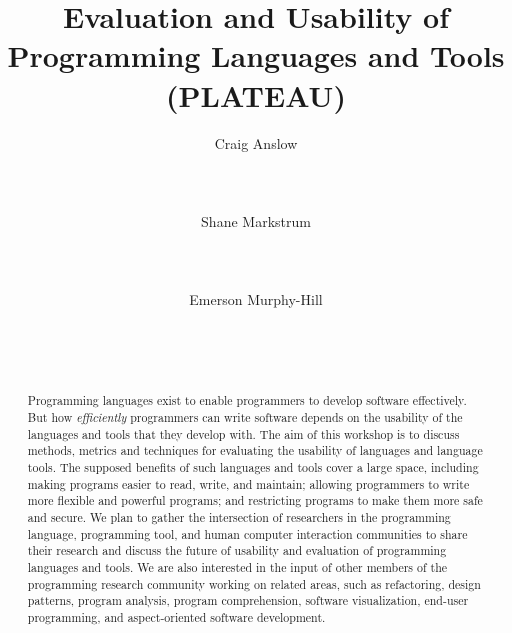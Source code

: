 \documentclass{acm_proc_article-sp}
\begin{document}
\title{Evaluation and Usability of Programming Languages and Tools (PLATEAU)}

\author{
\alignauthor Craig Anslow\\
       \\
       \\
       \\
\alignauthor Shane Markstrum\\
       \\
       \\
       \\
\alignauthor Emerson Murphy-Hill\\
       \\
       \\
       \\
       }

\date{}

\maketitle
\begin{abstract}

  Programming languages exist to enable
  programmers to develop software effectively.  But how
  \emph{efficiently} programmers can write software depends on the
  usability of the languages and tools that they develop with.  The
  aim of this workshop is to discuss methods, metrics and techniques
  for evaluating the usability of languages and language tools.  The
  supposed benefits of such languages and tools cover a large space,
  including making programs easier to read, write, and maintain;
  allowing programmers to write more flexible and powerful programs;
  and restricting programs to make them more safe and secure. We plan
  to gather the intersection of researchers in the
  programming language, programming tool, and human computer interaction communities
  to share their research and
  discuss the future of usability and evaluation of programming
  languages and tools. We are also interested in the input of other members of
  the programming research community working on related areas, such as
  refactoring, design patterns, program analysis, program
  comprehension, software visualization, end-user programming, and
  aspect-oriented software development.

\end{abstract}
\end{document}
